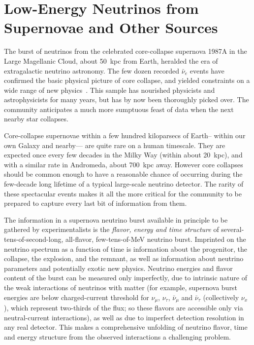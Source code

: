 
\section{Low-Energy Neutrinos from Supernovae and Other Sources}
\label{sec:landscape-snb}


The burst of neutrinos from the celebrated core-collapse supernova 1987A in the Large Magellanic Cloud, about
50~kpc from Earth, heralded the era of extragalactic neutrino
astronomy.  The few dozen recorded $\bar{\nu}_e$ events
have confirmed the basic physical
picture of core collapse, and yielded constraints on a wide range of new
physics~\cite{blah}.   This sample has nourished physicists and
astrophysicists for many years, but has
by now been thoroughly picked over.  The community anticipates a
much more sumptuous feast of data when the next nearby star collapses.

Core-collapse supernovae within a few hundred kiloparsecs of Earth--
within our own Galaxy and nearby--- are quite rare on a human
timescale.  They are expected once every few decades in the Milky Way
(within about 20~kpc), and with a similar rate in Andromeda, about
700~kpc away.  However core collapses should be common enough to have
a reasonable chance of occurring during the few-decade long lifetime
of a typical large-scale neutrino detector.  The rarity of these
spectacular events makes it all the more critical for the community to
be prepared to capture every last bit of information from them.

The information in a supernova neutrino burst available in principle
to be gathered by experimentalists is the \textit{flavor, energy and
  time structure} of several-tens-of-second-long, all-flavor,
few-tens-of-MeV neutrino burst.  Imprinted on the neutrino spectrum as
a function of time is information about the progenitor, the collapse,
the explosion, and the remnant, as well as information about neutrino
parameters and potentially exotic new physics.  Neutrino energies and
flavor content of the burst can be measured only imperfectly, due to
intrinsic nature of the weak interactions of neutrinos with matter
(for example, supernova burst energies are below charged-current
threshold for $\nu_\mu$, $\nu_\tau$, $\bar{\nu}_\mu$ and
$\bar{\nu}_{\tau}$ (collectively $\nu_x$), which represent two-thirds of the flux; so these
flavors are accessible only via neutral-current interactions), as well
as due to imperfect detection resolution in any real detector.  This
makes a comprehensive unfolding of neutrino flavor, time and energy
structure from the observed interactions a challenging problem.

